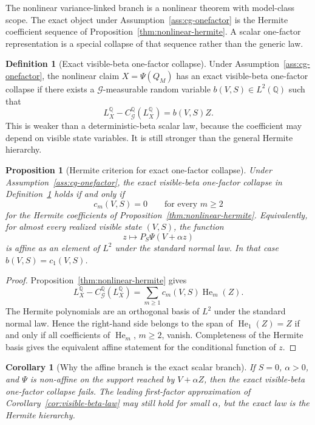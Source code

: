 \documentclass[11pt,a4paper]{amsart}
\theoremstyle{plain}
\newtheorem{proposition}[theorem]{Proposition}
\newtheorem{corollary}[theorem]{Corollary}
\theoremstyle{definition}
\newtheorem{definition}[theorem]{Definition}
\theoremstyle{remark}
\DeclareMathOperator{\He}{He}
\newcommand{\QQ}{\mathbb{Q}}
\newcommand{\cG}{\mathcal{G}}
\begin{document}
The nonlinear variance-linked branch is a nonlinear theorem with model-class scope.  The
exact object under Assumption~\ref{ass:cg-onefactor} is the Hermite coefficient sequence of
Proposition~\ref{thm:nonlinear-hermite}.  A scalar one-factor representation is a special collapse
of that sequence rather than the generic law.

\begin{definition}[Exact visible-beta one-factor collapse]
\label{def:visible-beta-collapse}
Under Assumption~\ref{ass:cg-onefactor}, the nonlinear claim \(X=\Psi(Q_M)\) has an exact
visible-beta one-factor collapse if there exists a \(\cG\)-measurable random variable
\(b(V,S)\in L^2(\QQ)\) such that
\[
        L_X^\QQ-C_\cG^\QQ(L_X^\QQ)=b(V,S)Z.
\]
This is weaker than a deterministic-beta scalar law, because the coefficient may depend on visible
state variables.  It is still stronger than the general Hermite hierarchy.
\end{definition}

\begin{proposition}[Hermite criterion for exact one-factor collapse]
\label{prop:hermite-one-factor-criterion}
Under Assumption~\ref{ass:cg-onefactor}, the exact visible-beta one-factor collapse in
Definition~\ref{def:visible-beta-collapse} holds if and only if
\[
        c_m(V,S)=0
        \qquad
        \text{for every }m\ge2
\]
for the Hermite coefficients of Proposition~\ref{thm:nonlinear-hermite}.  Equivalently, for almost
every realized visible state \((V,S)\), the function
\[
        z\longmapsto P_S\Psi(V+\alpha z)
\]
is affine as an element of \(L^2\) under the standard normal law.  In that case
\(b(V,S)=c_1(V,S)\).
\end{proposition}

\begin{proof}
Proposition~\ref{thm:nonlinear-hermite} gives
\[
        L_X^\QQ-C_\cG^\QQ(L_X^\QQ)=\sum_{m\ge1}c_m(V,S)\He_m(Z).
\]
The Hermite polynomials are an orthogonal basis of \(L^2\) under the standard normal law.  Hence
the right-hand side belongs to the span of \(\He_1(Z)=Z\) if and only if all coefficients of
\(\He_m\), \(m\ge2\), vanish.  Completeness of the Hermite basis gives the equivalent affine
statement for the conditional function of \(z\).
\end{proof}

\begin{corollary}[Why the affine branch is the exact scalar branch]
\label{cor:affine-branch-exact-scalar}
If \(S=0\), \(\alpha>0\), and \(\Psi\) is non-affine on the support reached by \(V+\alpha Z\),
then the exact visible-beta one-factor collapse fails.  The leading first-factor approximation of
Corollary~\ref{cor:visible-beta-law} may still hold for small \(\alpha\), but the exact law is the
Hermite hierarchy.
\end{corollary}
\end{document}
